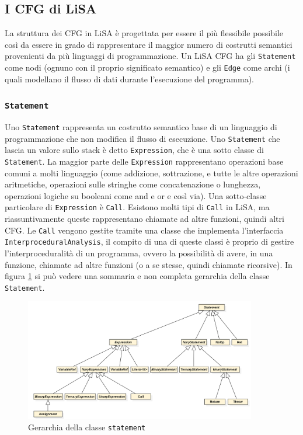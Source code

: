 \subsection{I CFG di LiSA}
La struttura dei CFG in LiSA è progettata per essere il più flessibile possibile così da essere in grado di rappresentare il maggior numero di costrutti semantici provenienti da più linguaggi di programmazione. Un LiSA CFG ha gli \texttt{Statement} come nodi (ognuno con il proprio significato semantico) e gli \texttt{Edge} come archi (i quali modellano il flusso di dati durante l'esecuzione del programma). 

\subsubsection{\texttt{Statement}}
Uno \texttt{Statement} rappresenta un costrutto semantico base di un linguaggio di programmazione che non modifica il flusso di esecuzione. Uno \texttt{Statement} che lascia un valore sullo stack è detto \texttt{Expression}, che è una sotto classe di \texttt{Statement}. La maggior parte delle \texttt{Expression} rappresentano operazioni base comuni a molti linguaggio (come addizione, sottrazione, e tutte le altre operazioni aritmetiche, operazioni sulle stringhe come concatenazione o lunghezza, operazioni logiche su booleani come and e or e così via). Una sotto-classe particolare di \texttt{Expression} è \texttt{Call}. Esistono molti tipi di \texttt{Call} in LiSA, ma riassuntivamente queste rappresentano chiamate ad altre funzioni, quindi altri CFG. Le \texttt{Call} vengono gestite tramite una classe che implementa l'interfaccia \texttt{InterproceduralAnalysis}, il compito di una di queste classi è proprio di gestire l'interproceduralità di un programma, ovvero la possibilità di avere, in una funzione, chiamate ad altre funzioni (o a se stesse, quindi chiamate ricorsive). In figura \ref{fig:gerarchiaStatement} si può vedere una sommaria e non completa gerarchia della classe \texttt{Statement}.

\begin{figure}[ht]
	\centering
	\includegraphics[width=0.9\textwidth]{Immagini/gerarchiaStatement.png}
	\caption{Gerarchia della classe \texttt{statement}}
	\label{fig:gerarchiaStatement}
\end{figure}

